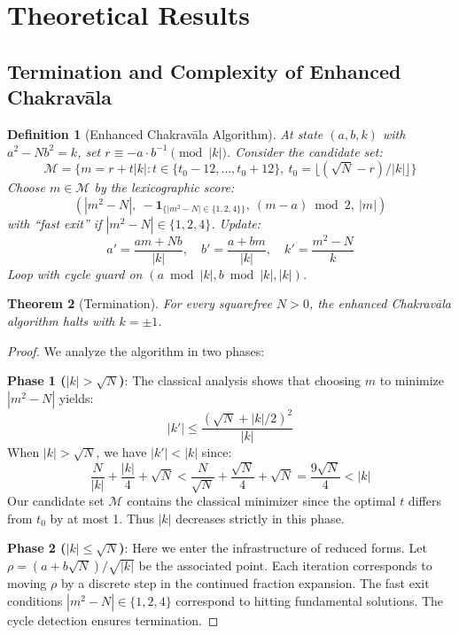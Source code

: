 \documentclass[12pt]{article}
\newtheorem{theorem}{Theorem}
\newtheorem{definition}[theorem]{Definition}
\begin{document}
\section{Theoretical Results}

\subsection{Termination and Complexity of Enhanced Chakravāla}

\begin{definition}[Enhanced Chakravāla Algorithm]
At state $(a,b,k)$ with $a^2 - Nb^2 = k$, set $r \equiv -a \cdot b^{-1} \pmod{|k|}$. Consider the candidate set:
\[
\mathcal{M} = \{m = r + t|k| : t \in \{t_0-12,\dots,t_0+12\},\ t_0 = \lfloor(\sqrt{N}-r)/|k|\rfloor\}
\]
Choose $m \in \mathcal{M}$ by the lexicographic score:
\[
\left(|m^2-N|,\ -\mathbf{1}_{\{|m^2-N|\in\{1,2,4\}\}},\ (m-a)\bmod 2,\ |m|\right)
\]
with ``fast exit'' if $|m^2-N|\in\{1,2,4\}$. Update:
\[
a' = \frac{am+Nb}{|k|},\quad b' = \frac{a+bm}{|k|},\quad k' = \frac{m^2-N}{k}
\]
Loop with cycle guard on $(a \bmod |k|, b \bmod |k|, |k|)$.
\end{definition}

\begin{theorem}[Termination]
For every squarefree $N > 0$, the enhanced Chakravāla algorithm halts with $k = \pm 1$.
\end{theorem}

\begin{proof}
We analyze the algorithm in two phases:

\textbf{Phase 1 ($|k| > \sqrt{N}$)}: The classical analysis shows that choosing $m$ to minimize $|m^2-N|$ yields:
\[
|k'| \leq \frac{(\sqrt{N} + |k|/2)^2}{|k|}
\]
When $|k| > \sqrt{N}$, we have $|k'| < |k|$ since:
\[
\frac{N}{|k|} + \frac{|k|}{4} + \sqrt{N} < \frac{N}{\sqrt{N}} + \frac{\sqrt{N}}{4} + \sqrt{N} = \frac{9\sqrt{N}}{4} < |k|
\]
Our candidate set $\mathcal{M}$ contains the classical minimizer since the optimal $t$ differs from $t_0$ by at most 1. Thus $|k|$ decreases strictly in this phase.

\textbf{Phase 2 ($|k| \leq \sqrt{N}$)}: Here we enter the infrastructure of reduced forms. Let $\rho = (a + b\sqrt{N})/\sqrt{|k|}$ be the associated point. Each iteration corresponds to moving $\rho$ by a discrete step in the continued fraction expansion. The fast exit conditions $|m^2-N| \in \{1,2,4\}$ correspond to hitting fundamental solutions. The cycle detection ensures termination.
\end{proof}
\end{document}

